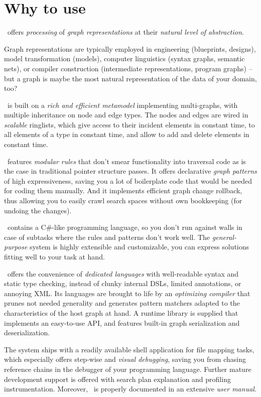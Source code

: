 \section{Why to use \GrG}

\GrG\ offers \emph{processing} of \emph{graph representations} at their \emph{natural level of abstraction}.

Graph representations are typically employed in engineering (blueprints, designs), model transformation (models), computer linguistics (syntax graphs, semantic nets), or compiler construction (intermediate representations, program graphs) -- but a graph is maybe the most natural representation of the data of your domain, too?

\GrG\ is built on a \emph{rich and efficient metamodel} implementing multi-graphs, with multiple inheritance on node and edge types.
The nodes and edges are wired in \emph{scalable} ringlists, which give access to their incident elements in constant time, to all elements of a type in constant time, and allow to add and delete elements in constant time.

\GrG\ features \emph{modular rules} that don't smear functionality into traversal code as is the case in traditional pointer structure passes.
It offers declarative \emph{graph patterns} of high expressiveness, saving you a lot of boilerplate code that would be needed for coding them manually.
And it implements efficient graph change rollback, thus allowing you to easily crawl search spaces without own bookkeeping (for undoing the changes).

\GrG\ contains a C\#-like programming language, so you don't run against walls in case of subtasks where the rules and patterns don't work well.
The \emph{general-purpose} system is highly extensible and customizable, you can express solutions fitting well to your task at hand.

\GrG\ offers the convenience of \emph{dedicated languages} with well-readable syntax and static type checking, instead of clunky internal DSLs, limited annotations, or annoying XML.
Its languages are brought to life by an \emph{optimizing compiler} that prunes not needed generality and generates pattern matchers adapted to the characteristics of the host graph at hand.
A runtime library is supplied that implements an easy-to-use API, and features built-in graph serialization and deserialization.

The system ships with a readily available shell application for file mapping tasks, which especially offers step-wise and \emph{visual debugging}, saving you from chasing reference chains in the debugger of your programming language.
Further mature development support is offered with search plan explanation and profiling instrumentation. 
Moreover, \GrG\ is properly documented in an extensive \emph{user manual}.

